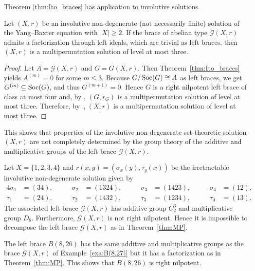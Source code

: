 Theorem \ref{thm:Ito_braces} has application to involutive solutions. 

\begin{theorem} 
\label{thm:MP}
Let $(X,r)$ be an involutive non-degenerate (not necessarily finite) solution of the Yang--Baxter equation with $|X|\geq 2$.
If the brace of abelian type $\mathcal{G}(X,r)$ admits a factorization through left ideals, 
which are trivial as left braces, then $(X,r)$ is a
multipermutation solution of level at most three.
\end{theorem}

\begin{proof}
Let $A=\mathcal{G}(X,r)$ and $G=G(X,r)$. Then Theorem~\ref{thm:Ito_braces} 
yields $A^{(m)}=0$ for some $m\leq 3$. Because $G/\operatorname{Soc}(G)\cong A$
as left braces, we get $G^{(m)}\subseteq\operatorname{Soc}(G)$, and thus $G^{(m+1)}=0$. Hence $G$ is a right nilpotent left brace of class at most four and,
by \cite[Proposition 6]{MR3574204}, $(G,r_G)$ is a multipermutation solution of  level at most three. Therefore, by~\cite[Theorem 5.15]{MR3861714}, 
$(X,r)$ is a multipermutation solution of level at most three.
\end{proof}

This shows that properties of the involutive non-degenerate set-theoretic solution $(X,r)$ are not completely determined by the
group theory of the additive and multiplicative groups of the left brace $\mathcal{G}(X,r)$. 

\begin{example}
\label{exa:B(8,27)}
Let $X=\{1,2,3,4\}$ and $r(x,y)=(\sigma_x(y),\tau_y(x))$ be the irretractable involutive non-degenerate solution given by 
\begin{alignat*}{4}
    \sigma_1 & =(34),\qquad & \sigma_2 & =(1324),\qquad & \sigma_3 & =(1423),\qquad & \sigma_4 & =(12),\\
    \tau_1 & =(24),\qquad & \tau_2 & =(1432),\qquad & \tau_3 & =(1234),\qquad & \tau_4 & =(13).
\end{alignat*}
The associated left brace $\mathcal{G}(X,r)$ has additive group $C_2^3$ and multiplicative group $D_8$. Furthermore,
$\mathcal{G}(X,r)$ is not right nilpotent. Hence it is impossible to decompose the left brace $\mathcal{G}(X,r)$ as in Theorem~\ref{thm:MP}. 
\end{example}

\begin{example}
The left brace $B(8,26)$ has the same additive and multiplicative groups as the brace $\mathcal{G}(X,r)$ 
of Example~\ref{exa:B(8,27)} but it has a factorization as in Theorem~\ref{thm:MP}. 
This shows that $B(8,26)$ is right nilpotent. 
\end{example}



